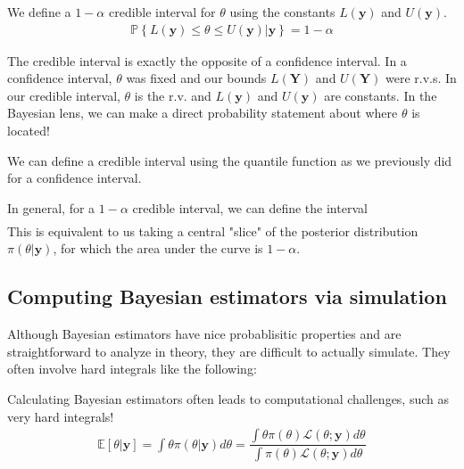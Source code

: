 \documentclass[12pt]{article}
\newcommand{\E}{\mathbb{E}}
\newcommand{\Prob}{\mathbb{P}}
\begin{document}
\medskip

\begin{tcolorbox}[breakable, title= \textbf{Definition}: Credible interval]
    We define a $1-\alpha$ credible interval for $\theta$ using the constants $L(\textbf{y})$ and $U(\textbf{y})$.
    \begin{align*}
        \Prob\left\{L(\textbf{y}) \leq \theta \leq U(\textbf{y})|\textbf{y}\right\} = 1 -\alpha
    \end{align*}
\end{tcolorbox}

\medskip

\noindent The credible interval is exactly the opposite of a confidence interval. In a confidence interval, $\theta$ was fixed and our bounds $L(\textbf{Y})$ and $U(\textbf{Y})$ were r.v.s. In our credible interval,  $\theta$ is the r.v. and $L(\textbf{y})$ and $U(\textbf{y})$ are constants. In the Bayesian lens, we can make a direct probability statement about where $\theta$ is located!

\medskip

\noindent We can define a credible interval using the quantile function as we previously did for a confidence interval.

\begin{tcolorbox}[breakable, title = \textbf{Remark}: Defining credible interval with quantiles]
    In general, for a $1-\alpha$ credible interval, we can define the interval
    \begin{align*}
        [Q_{\theta|\textbf{y}}(\alpha/2), Q_{\theta|\textbf{y}}(1- \alpha/2)]
    \end{align*}
    This is equivalent to us taking a central "slice" of the posterior distribution $\pi(\theta|\textbf{y})$, for which the area under the curve is $1-\alpha$.
\end{tcolorbox}

\medskip

\subsection{Computing Bayesian estimators via simulation}

\noindent Although Bayesian estimators have nice probablisitic properties and are straightforward to analyze in theory, they are difficult to actually simulate. They often involve hard integrals like the following:

\medskip

\begin{tcolorbox}[breakable, title= \textbf{Example}: Computing the posterior mean]
Calculating Bayesian estimators often leads to computational challenges, such as very hard integrals!
    \begin{align*}
        \E[\theta|\textbf{y}] = \int\theta\pi(\theta|\textbf{y})d\theta = \dfrac{\int\theta \pi(\theta)\mathcal{L}(\theta;\textbf{y})d\theta}{\int\pi(\theta)\mathcal{L}(\theta;\textbf{y})d\theta}
    \end{align*}
\end{tcolorbox}
\end{document}
